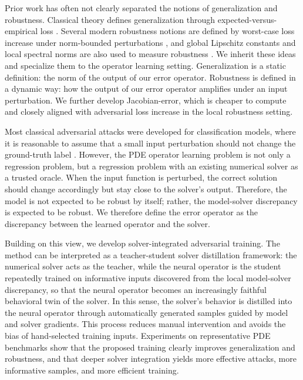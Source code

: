 \documentclass[letterpaper]{article} %
\begin{document}
Prior work has often not clearly separated the notions of generalization and
robustness.
Classical theory defines generalization through expected-versus-empirical loss
\citep{bousquet2002stability,xu2012robustness}. Several modern robustness
notions are defined by worst-case loss increase under norm-bounded
perturbations \citep{madry2018towards}, and global Lipschitz constants and
local spectral norms are also used to measure robustness
\citep{cisse2017parseval,huang2026stablepdenet}. We inherit these ideas and
specialize them to the operator learning setting. Generalization is a static
definition: the norm of the output of our error operator. Robustness is defined
in a dynamic way: how the output of our error operator amplifies under an input
perturbation. We further develop Jacobian-error, which is cheaper to
compute and closely aligned with adversarial loss increase in the local
robustness setting.

Most classical adversarial attacks were developed for classification models, where it
is reasonable to assume that a small input perturbation should not change the
ground-truth label \citep{goodfellow2015explaining,madry2018towards}. However,
the PDE operator learning problem is not only a regression problem, but a
regression problem with an existing numerical solver as a trusted oracle. When
the input function is perturbed, the correct solution should change accordingly
but stay close to the solver's output. Therefore, the model is not expected to
be robust by itself; rather, the model-solver discrepancy is expected to be
robust. We therefore define the error operator as the discrepancy between the
learned operator and the solver.

Building on this view, we develop solver-integrated adversarial training. The
method can be interpreted as a teacher-student solver distillation framework:
the numerical solver acts as the teacher, while the neural operator is the
student repeatedly trained on informative inputs discovered from the local
model-solver discrepancy, so that the neural operator becomes an increasingly
faithful behavioral twin of the solver. In this sense, the solver's behavior is
distilled into the neural operator through automatically generated samples
guided by model and solver gradients. This process reduces manual intervention
and avoids the bias of hand-selected training inputs.
Experiments on representative PDE benchmarks show that the proposed training
clearly improves generalization and robustness, and that deeper solver
integration yields more effective attacks, more informative samples, and more
efficient training.
\end{document}
